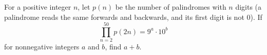 For a positive integer $n$, let $p(n)$ be the number of palindromes with $n$ digits (a palindrome reads the same forwards and backwards, and its first digit is not $0$). If
\[\prod_{n=2}^{50}p(2n)=9^a\cdot10^b\]
for nonnegative integers $a$ and $b$, find $a+b$.
